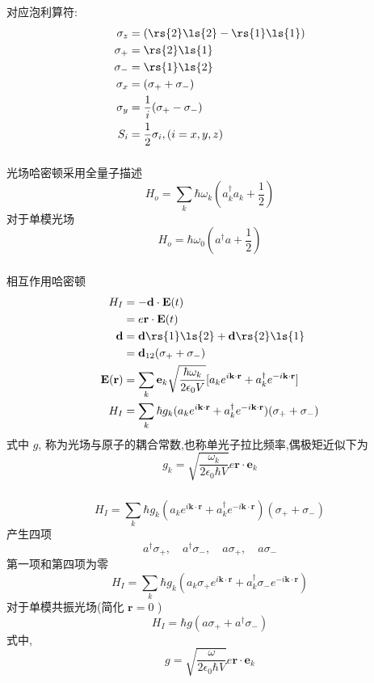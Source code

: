 \begin{frame} 
\frametitle{}
   对应泡利算符:
    \[\begin{aligned}
        \sigma_z &=  (\rs{2} \ls{2}-\rs{1} \ls{1})\\ 
        \sigma_{+} &= \rs{2} \ls{1} \\ 
        \sigma_{-} &= \rs{1} \ls{2} \\ 
        \sigma_x &= (\sigma_{+}+ \sigma_{-}) \\ 
        \sigma_y &= \frac{1}{i}(\sigma_{+}- \sigma_{-}) \\ 
        S_i & =\frac{1}{2} \sigma_i, (i=x,y,z)
    \end{aligned} \]    
\end{frame}

\begin{frame} 
\frametitle{}
{\Bullet} 光场哈密顿采用全量子描述
\[ H_o = \sum_k \hbar \omega_k (a^{\dagger} _k a_k+\frac{1}{2})\]
对于单模光场
\[ H_o =  \hbar \omega_0 (a^{\dagger}  a + \frac{1}{2})\]
\end{frame}

\begin{frame} 
\frametitle{}
{\Bullet} 相互作用哈密顿   
\[ \begin{aligned}
    H_{I} & =  - \mathbf{d}\cdot \mathbf{E}(t)\\
    &= e\mathbf{r} \cdot \mathbf{E}(t) \\
    \mathbf{d} & = \mathbf{d}\rs{1}\ls{2}  + \mathbf{d}\rs{2}\ls{1} \\ 
    &= \mathbf{d}_{12} (\sigma_+ + \sigma_-) \\ 
    \mathbf{E}(\mathbf{r}) &= \sum_k \mathbf{e}_k \sqrt{ \frac{\hbar\omega_k}{2 \epsilon_0 V}} [{a}_k e^{i \mathbf{k}\cdot \mathbf{r}} + {a}^{\dagger} _k e^{-i \mathbf{k}\cdot \mathbf{r}} ] \\ 
    H_{I} & = \sum_k  \hbar g_k ({a}_k e^{i \mathbf{k}\cdot \mathbf{r}} + {a}^{\dagger} _k e^{-i \mathbf{k}\cdot \mathbf{r}} )(\sigma_+ + \sigma_-) 
\end{aligned}\] 
式中 $g$, 称为光场与原子的耦合常数,也称单光子拉比频率,偶极矩近似下为 
\[ g_k = \sqrt{ \frac{\omega_k}{2  \epsilon_0 \hbar V}} e \mathbf{r}\cdot\mathbf{e}_k \]
\end{frame}

\begin{frame} 
\frametitle{}
     \[ H_{I}  = \sum_k  \hbar g_k ({a}_k e^{i \mathbf{k}\cdot \mathbf{r}} + {a}^{\dagger} _k e^{-i \mathbf{k}\cdot \mathbf{r}} )(\sigma_+ + \sigma_-) \]
     产生四项
     \[ {a}^{\dagger} \sigma_+, \quad {a}^{\dagger} \sigma_-, \quad {a} \sigma_+, \quad {a} \sigma_- \]
     第一项和第四项为零
     \[ H_{I}  = \sum_k  \hbar g_k ({a}_k \sigma_+ e^{i \mathbf{k}\cdot \mathbf{r}} + {a}^{\dagger} _k \sigma_- e^{-i \mathbf{k}\cdot \mathbf{r}} )\]
     对于单模共振光场(简化 $\mathbf{r}=0$ )
     \[ H_{I} = \hbar g (a\sigma_+  +  a ^{\dagger} \sigma_{-} )\]
     式中,
     \[ g = \sqrt{ \frac{\omega}{2  \epsilon_0 \hbar V}} e \mathbf{r}\cdot\mathbf{e}_k \]
\end{frame}

